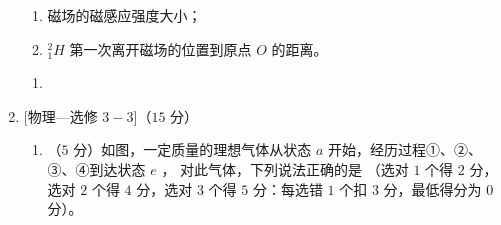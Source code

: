 \begin{enumerate}
\begin{enumerate}
\item 
磁场的磁感应强度大小；





\item 
$ ^{2}_{1}H $ 第一次离开磁场的位置到原点 $ O $ 的距离。




\end{enumerate}
\begin{figure}[h!]
\flushright

\end{figure}





\begin{enumerate}[leftmargin=-2em]
\renewcommand{\labelenumii}{}
\item
{}
\end{enumerate}


\item 

[物理—选修 $ 3-3 $]（$ 15 $ 分）


\begin{enumerate}
\renewcommand{\labelenumi}{\arabic{enumi}.}
\item
（$ 5 $ 分）如图，一定质量的理想气体从状态 $ a $ 开始，经历过程①、②、③、④到达状态 $ e $ ，
对此气体，下列说法正确的是
（选对 $ 1 $ 个得 $ 2 $ 分，选对 $ 2 $ 个得 $ 4 $ 分，选对 $ 3 $ 个得 $ 5 $
分：每选错 $ 1 $ 个扣 $ 3 $ 分，最低得分为 $ 0 $ 分）。
\begin{figure}[h!]
\centering 

\end{figure}




\end{enumerate}
\end{enumerate}

